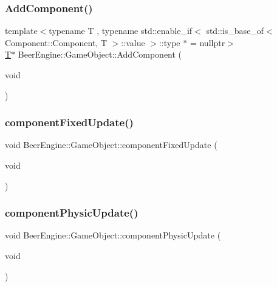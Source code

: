 \subsubsection{\texorpdfstring{Add\+Component()}{AddComponent()}}
{\footnotesize\ttfamily template$<$typename T , typename std\+::enable\+\_\+if$<$ std\+::is\+\_\+base\+\_\+of$<$ Component\+::\+Component, T $>$\+::value $>$\+::type $\ast$  = nullptr$>$ \\
\mbox{\hyperlink{namespace_beer_engine_a94f0b552f6dc910de8cdb44207981f53a8de48e594408f9fc561b2f68ce05f664}{T}}$\ast$ Beer\+Engine\+::\+Game\+Object\+::\+Add\+Component (\begin{DoxyParamCaption}\item[{void}]{ }\end{DoxyParamCaption})\hspace{0.3cm}{\ttfamily [inline]}}

\mbox{\label{class_beer_engine_1_1_game_object_a50b9ea3bbd7fa155f5ab4b4b1da52b7a}} 
\subsubsection{\texorpdfstring{component\+Fixed\+Update()}{componentFixedUpdate()}}
{\footnotesize\ttfamily void Beer\+Engine\+::\+Game\+Object\+::component\+Fixed\+Update (\begin{DoxyParamCaption}\item[{void}]{ }\end{DoxyParamCaption})}

\mbox{\label{class_beer_engine_1_1_game_object_ada13344658678ac8c9c62ea4df5b3ee0}} 
\subsubsection{\texorpdfstring{component\+Physic\+Update()}{componentPhysicUpdate()}}
{\footnotesize\ttfamily void Beer\+Engine\+::\+Game\+Object\+::component\+Physic\+Update (\begin{DoxyParamCaption}\item[{void}]{ }\end{DoxyParamCaption})}

